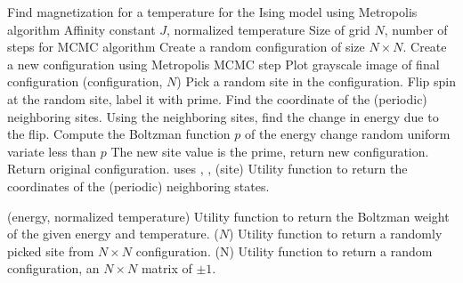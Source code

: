 \documentclass[12pt]{article}
\begin{document}
\begin{codebox}
\li  {}
\li  \Comment Find magnetization for a temperature for the Ising model
\li    using Metropolis algorithm
\li  {} Affinity constant $J$, normalized temperature
\li  {} Size of grid $N$, number of steps for MCMC algorithm
\li   Create a random configuration of size $N \times N$.
\li  {}
\li  \Do 
\li       Create a new configuration using Metropolis MCMC step
\li  \End
\li   Plot grayscale image of final configuration
\zi
\li  {}(configuration, $N$)
\li   Pick a random site in the configuration.
\li   Flip spin at the random site, label it with prime.
\li   Find the coordinate of the (periodic) neighboring sites.
\li   Using the neighboring sites, find the change in energy due to
      the flip.
\li   Compute the Boltzman function $p$ of the energy change
\li  \If random uniform variate less than $p$
\li      \Then
          The new site value is the prime, return new configuration.
\li  \Else
          Return original configuration.
\li  \End
\li       uses , , 
\zi          
\li  {}(site)
\li   Utility function to return the coordinates of the (periodic) neighboring states.

\li  {}(energy, normalized temperature)
\li   Utility function to return the Boltzman weight
\li   of the given energy and temperature.
\zi
\li  {}($N$)
\li   Utility function to return a randomly picked site from $N \times N$
  configuration.
\zi
\li  {}(N)
\li   Utility function to return a random configuration,
\li   an $N \times N$ matrix of $\pm 1$. 
\end{codebox}
\end{document}
